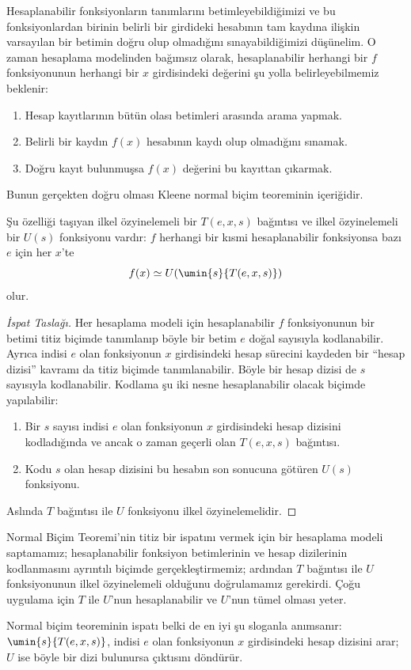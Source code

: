 \documentclass[../../../include/open-logic-section]{subfiles}
\begin{document}

Hesaplanabilir fonksiyonların tanımlarını betimleyebildiğimizi ve bu
fonksiyonlardan birinin belirli bir girdideki hesabının tam kaydına ilişkin
varsayılan bir betimin doğru olup olmadığını sınayabildiğimizi düşünelim.
O zaman hesaplama modelinden bağımsız olarak, hesaplanabilir herhangi bir
$f$ fonksiyonunun herhangi bir $x$ girdisindeki değerini şu yolla
belirleyebilmemiz beklenir:
\begin{enumerate}
\item Hesap kayıtlarının bütün olası betimleri arasında arama yapmak.
\item Belirli bir kaydın $f(x)$ hesabının kaydı olup olmadığını sınamak.
\item Doğru kayıt bulunmuşsa $f(x)$ değerini bu kayıttan çıkarmak.
\end{enumerate}
Bunun gerçekten doğru olması Kleene normal biçim teoreminin içeriğidir.

\begin{thm}
Şu özelliği taşıyan ilkel özyinelemeli bir $T(e,x,s)$ bağıntısı ve ilkel
özyinelemeli bir $U(s)$ fonksiyonu vardır: $f$ herhangi bir kısmi
hesaplanabilir fonksiyonsa bazı $e$ için her $x$'te
\[
  f(x)\simeq U(\umin{s}{T(e,x,s)})
\]
olur.
\end{thm}

\begin{proof}[İspat Taslağı]
Her hesaplama modeli için hesaplanabilir $f$ fonksiyonunun bir betimi titiz
biçimde tanımlanıp böyle bir betim $e$ doğal sayısıyla kodlanabilir. Ayrıca
indisi $e$ olan fonksiyonun $x$ girdisindeki hesap sürecini kaydeden bir
``hesap dizisi'' kavramı da titiz biçimde tanımlanabilir. Böyle bir hesap
dizisi de $s$ sayısıyla kodlanabilir. Kodlama şu iki nesne hesaplanabilir
olacak biçimde yapılabilir:
\begin{enumerate}
\item Bir $s$ sayısı indisi $e$ olan fonksiyonun $x$ girdisindeki hesap
  dizisini kodladığında ve ancak o zaman geçerli olan $T(e,x,s)$ bağıntısı.
\item Kodu $s$ olan hesap dizisini bu hesabın son sonucuna götüren $U(s)$
  fonksiyonu.
\end{enumerate}
Aslında $T$ bağıntısı ile $U$ fonksiyonu ilkel özyinelemelidir.
\end{proof}

\begin{explain}
Normal Biçim Teoremi'nin titiz bir ispatını vermek için bir hesaplama modeli
saptamamız; hesaplanabilir fonksiyon betimlerinin ve hesap dizilerinin
kodlanmasını ayrıntılı biçimde gerçekleştirmemiz; ardından $T$ bağıntısı ile
$U$ fonksiyonunun ilkel özyinelemeli olduğunu doğrulamamız gerekirdi. Çoğu
uygulama için $T$ ile $U$'nun hesaplanabilir ve $U$'nun tümel olması yeter.

Normal biçim teoreminin ispatı belki de en iyi şu sloganla anımsanır:
$\umin{s}{T(e,x,s)}$, indisi $e$ olan fonksiyonun $x$ girdisindeki hesap
dizisini arar; $U$ ise böyle bir dizi bulunursa çıktısını döndürür.
\end{explain}
\end{document}
